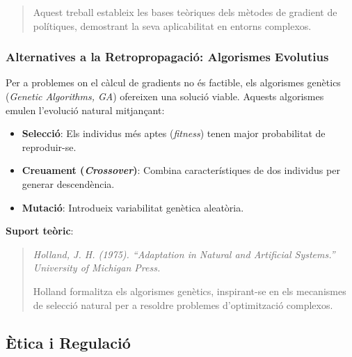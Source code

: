 {\begin{quote}
Aquest treball estableix les bases teòriques dels mètodes de gradient de polítiques, demostrant la seva aplicabilitat en entorns complexos.
\end{quote}

\subsubsection{Alternatives a la Retropropagació: Algorismes Evolutius}
Per a problemes on el càlcul de gradients no és factible, els algorismes genètics (\textit{Genetic Algorithms, GA}) ofereixen una solució viable. Aquests algorismes emulen l'evolució natural mitjançant:

\begin{itemize}
\item \textbf{Selecció}: Els individus més aptes (\textit{fitness}) tenen major probabilitat de reproduir-se.

\item \textbf{Creuament (\textit{Crossover})}: Combina característiques de dos individus per generar descendència.

\item \textbf{Mutació}: Introdueix variabilitat genètica aleatòria.
\end{itemize}

\textbf{Suport teòric}:
\begin{quote}
\textit{Holland, J. H. (1975). ``Adaptation in Natural and Artificial Systems.'' University of Michigan Press.}

Holland formalitza els algorismes genètics, inspirant-se en els mecanismes de selecció natural per a resoldre problemes d'optimització complexos.
\end{quote}

\subsection{Ètica i Regulació}\label{subsec:Ètica i Regulació}

}
